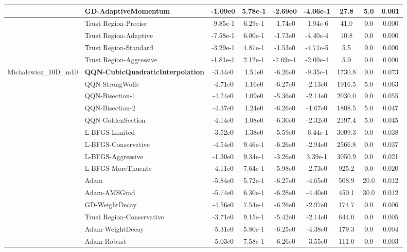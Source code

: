\documentclass[10pt]{article}
\begin{document}
\begin{longtable}{|l|l|c|c|c|c|c|c|c|}
\hline
 & GD-AdaptiveMomentum & -1.09e0 & 5.78e-1 & -2.69e0 & -4.06e-1 & 27.8 & 5.0 & 0.001 \\
\hline
 & Trust Region-Precise & -9.85e-1 & 6.29e-1 & -1.74e0 & -1.94e-6 & 41.0 & 0.0 & 0.000 \\
\hline
 & Trust Region-Adaptive & -7.58e-1 & 6.00e-1 & -1.73e0 & -4.40e-4 & 10.8 & 0.0 & 0.000 \\
\hline
 & Trust Region-Standard & -3.29e-1 & 4.87e-1 & -1.53e0 & -4.71e-5 & 5.5 & 0.0 & 0.000 \\
\hline
 & Trust Region-Aggressive & -1.81e-1 & 2.12e-1 & -7.69e-1 & -2.00e-4 & 5.0 & 0.0 & 0.000 \\
Michalewicz\_10D\_m10 & \textbf{QQN-CubicQuadraticInterpolation} & -3.34e0 & 1.51e0 & -6.26e0 & -9.35e-1 & 1730.8 & 0.0 & 0.073 \\
\hline
 & QQN-StrongWolfe & -4.71e0 & 1.16e0 & -6.27e0 & -2.13e0 & 1916.5 & 5.0 & 0.063 \\
\hline
 & QQN-Bisection-1 & -4.24e0 & 1.09e0 & -5.36e0 & -2.14e0 & 2030.0 & 0.0 & 0.055 \\
\hline
 & QQN-Bisection-2 & -4.37e0 & 1.24e0 & -6.26e0 & -1.67e0 & 1808.5 & 5.0 & 0.047 \\
\hline
 & QQN-GoldenSection & -4.14e0 & 1.08e0 & -6.30e0 & -2.32e0 & 2197.4 & 5.0 & 0.045 \\
\hline
 & L-BFGS-Limited & -3.52e0 & 1.38e0 & -5.59e0 & -6.44e-1 & 3009.3 & 0.0 & 0.038 \\
\hline
 & L-BFGS-Conservative & -4.54e0 & 9.46e-1 & -6.26e0 & -2.94e0 & 2566.8 & 0.0 & 0.037 \\
\hline
 & L-BFGS-Aggressive & -1.30e0 & 9.34e-1 & -3.26e0 & 3.39e-1 & 3050.9 & 0.0 & 0.021 \\
\hline
 & L-BFGS-MoreThuente & -4.11e0 & 7.64e-1 & -5.98e0 & -2.73e0 & 925.2 & 0.0 & 0.020 \\
\hline
 & Adam & -5.84e0 & 5.72e-1 & -6.27e0 & -4.65e0 & 508.9 & 20.0 & 0.012 \\
\hline
 & Adam-AMSGrad & -5.74e0 & 6.30e-1 & -6.28e0 & -4.40e0 & 450.1 & 30.0 & 0.012 \\
\hline
 & GD-WeightDecay & -4.56e0 & 7.54e-1 & -6.26e0 & -2.97e0 & 174.7 & 0.0 & 0.006 \\
\hline
 & Trust Region-Conservative & -3.71e0 & 9.15e-1 & -5.42e0 & -2.14e0 & 644.0 & 0.0 & 0.005 \\
\hline
 & Adam-WeightDecay & -5.31e0 & 5.80e-1 & -6.25e0 & -4.38e0 & 179.3 & 0.0 & 0.004 \\
\hline
 & Adam-Robust & -5.03e0 & 7.58e-1 & -6.26e0 & -3.55e0 & 111.0 & 0.0 & 0.003 \\

\end{longtable}
\end{document}
